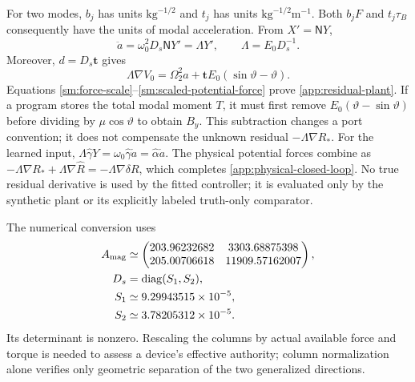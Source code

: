 For two modes, $b_j$ has units $\mathrm{kg}^{-1/2}$ and
$t_j$ has units $\mathrm{kg}^{-1/2}\mathrm m^{-1}$.
Both $b_jF$ and $t_j\tau_B$ consequently have the units of modal
acceleration. From $X'=\mathsf NY$,
\begin{equation}
 \ddot a=\omega_0^2D_s\mathsf NY'=\Lambda Y',\qquad
 \Lambda=E_0D_s^{-1}.
 \label{sm:force-scale}
\end{equation}
Moreover, $d=D_s\boldsymbol t$ gives
\begin{equation}
 \Lambda\nabla V_0
 =\Omega_2^2a+\boldsymbol t E_0(\sin\vartheta-\vartheta).
 \label{sm:scaled-potential-force}
\end{equation}
Equations \eqref{sm:force-scale}--\eqref{sm:scaled-potential-force}
prove \eqref{app:residual-plant}. If a program stores the total modal
moment $T$, it must first remove
$E_0(\vartheta-\sin\vartheta)$ before dividing by
$\mu\cos\vartheta$ to obtain $B_y$.
This subtraction changes a port convention; it does not compensate the
unknown residual $-\Lambda\nabla R_*$.
For the learned input, $\Lambda\widehat\gamma Y=
\omega_0\widehat\gamma\dot a=\widehat\alpha\dot a$.
The physical potential forces combine as
$-\Lambda\nabla R_*+\Lambda\nabla\widehat R
=-\Lambda\nabla\delta R$, which completes
\eqref{app:physical-closed-loop}. No true residual derivative is used
by the fitted controller; it is evaluated only by the synthetic plant
or its explicitly labeled truth-only comparator.


The numerical conversion uses
\begin{align}
 A_{\rm mag}&\simeq
 \begin{pmatrix}
 203.96232682&3303.68875398\\
 205.00706618&11909.57162007
 \end{pmatrix},\nonumber\\
 D_s&=\operatorname{diag}(S_1,S_2),\nonumber\\
 S_1&\simeq9.29943515\times10^{-5},\nonumber\\
 S_2&\simeq3.78205312\times10^{-5}.
 \label{sm:numerical-ports}
\end{align}
Its determinant is nonzero. Rescaling the columns by actual available
force and torque is needed to assess a device's effective authority;
column normalization alone verifies only geometric separation of the
two generalized directions.


